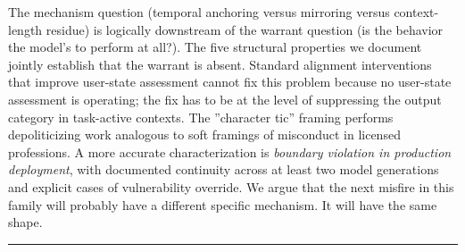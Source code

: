 \documentclass{obelus-preprint}
\begin{document}
The mechanism question (temporal anchoring versus mirroring versus context-length residue) is logically downstream of the warrant question (is the behavior the model's to perform at all?). The five structural properties we document jointly establish that the warrant is absent. Standard alignment interventions that improve user-state assessment cannot fix this problem because no user-state assessment is operating; the fix has to be at the level of suppressing the output category in task-active contexts.
The ''character tic'' framing performs depoliticizing work analogous to soft framings of misconduct in licensed professions. A more accurate characterization is \emph{boundary violation in production deployment}, with documented continuity across at least two model generations and explicit cases of vulnerability override. We argue that the next misfire in this family will probably have a different specific mechanism. It will have the same shape.
\bigskip\hrule\bigskip
\end{document}
